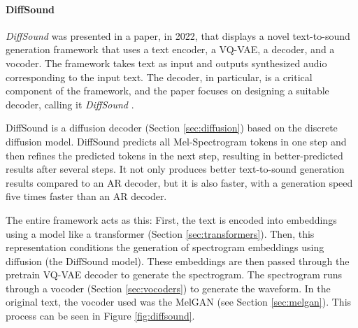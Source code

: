 \paragraph{DiffSound}

\textit{DiffSound} was presented in a paper, in 2022, that displays a novel text-to-sound generation framework that uses a text encoder, a \ac{VQ-VAE}, a decoder, and a vocoder. The framework takes text as input and outputs synthesized audio corresponding to the input text. The decoder, in particular, is a critical component of the framework, and the paper focuses on designing a suitable decoder, calling it \textit{DiffSound} \cite{yang_diffsound_2022}.

DiffSound is a diffusion decoder (Section \ref{sec:diffusion}) based on the discrete diffusion model. DiffSound predicts all Mel-Spectrogram tokens in one step and then refines the predicted tokens in the next step, resulting in better-predicted results after several steps. It not only produces better text-to-sound generation results compared to an \ac{AR} decoder, but it is also faster, with a generation speed five times faster than an \ac{AR} decoder.

The entire framework acts as this: First, the text is encoded into embeddings using a model like a transformer (Section \ref{sec:transformers}). Then, this representation conditions the generation of spectrogram embeddings using diffusion (the DiffSound model). These embeddings are then passed through the pretrain \ac{VQ-VAE} decoder to generate the spectrogram. The spectrogram runs through a vocoder (Section \ref{sec:vocoders}) to generate the waveform. In the original text, the vocoder used was the MelGAN (see Section \ref{sec:melgan}). This process can be seen in Figure \ref{fig:diffsound}.

